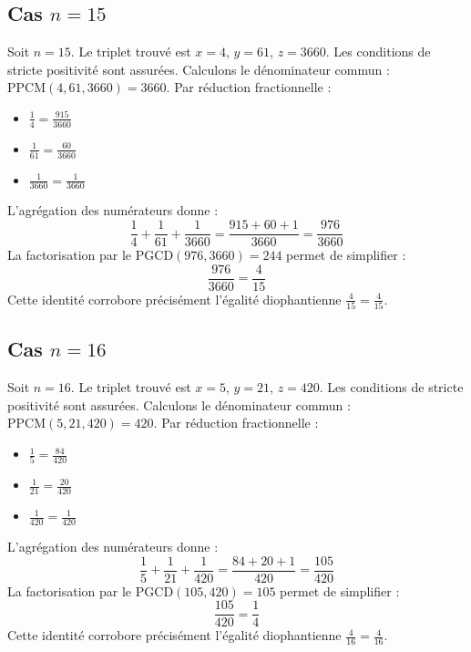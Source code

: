 \documentclass[11pt,a4paper]{article}
\begin{document}
\subsection{Cas $n = 15$}
Soit $n = 15$. Le triplet trouvé est $x = 4$, $y = 61$, $z = 3660$.
Les conditions de stricte positivité sont assurées.
Calculons le dénominateur commun : $\text{PPCM}(4, 61, 3660) = 3660$.
Par réduction fractionnelle :
\begin{itemize}
    \item $\frac{1}{4} = \frac{915}{3660}$
    \item $\frac{1}{61} = \frac{60}{3660}$
    \item $\frac{1}{3660} = \frac{1}{3660}$
\end{itemize}
L'agrégation des numérateurs donne :
$$ \frac{1}{4} + \frac{1}{61} + \frac{1}{3660} = \frac{915 + 60 + 1}{3660} = \frac{976}{3660} $$
La factorisation par le $\text{PGCD}(976, 3660) = 244$ permet de simplifier :
$$ \frac{976}{3660} = \frac{4}{15} $$
Cette identité corrobore précisément l'égalité diophantienne $\frac{4}{15} = \frac{4}{15}$.

\subsection{Cas $n = 16$}
Soit $n = 16$. Le triplet trouvé est $x = 5$, $y = 21$, $z = 420$.
Les conditions de stricte positivité sont assurées.
Calculons le dénominateur commun : $\text{PPCM}(5, 21, 420) = 420$.
Par réduction fractionnelle :
\begin{itemize}
    \item $\frac{1}{5} = \frac{84}{420}$
    \item $\frac{1}{21} = \frac{20}{420}$
    \item $\frac{1}{420} = \frac{1}{420}$
\end{itemize}
L'agrégation des numérateurs donne :
$$ \frac{1}{5} + \frac{1}{21} + \frac{1}{420} = \frac{84 + 20 + 1}{420} = \frac{105}{420} $$
La factorisation par le $\text{PGCD}(105, 420) = 105$ permet de simplifier :
$$ \frac{105}{420} = \frac{1}{4} $$
Cette identité corrobore précisément l'égalité diophantienne $\frac{4}{16} = \frac{4}{16}$.
\end{document}
